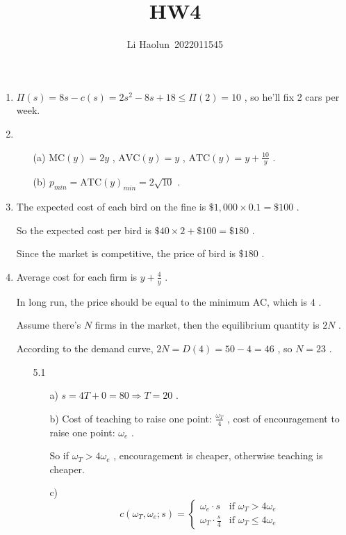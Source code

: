 \documentclass{article}
\title{HW4}
\author{Li Haolun\ 2022011545}
\begin{document}
\maketitle
\begin{enumerate}
    \item $\Pi(s)=8s-c(s)=2s^2-8s+18\leq\Pi(2)=10$ , so he'll fix 2 cars per week.
    \item \begin{enumerate}
        \item[(a)] $\text{MC}(y)=2y$ , $\text{AVC}(y)=y$ , $\text{ATC}(y)=y+\frac{10}{y}$ .
        \item[(b)] $p_{min}=\text{ATC}(y)_{min}=2\sqrt{10}$ .
    \end{enumerate}
    \item The expected cost of each bird on the fine is $\$1,000\times0.1=\$100$ . \par
    So the expected cost per bird is $\$40\times2+\$100=\$180$ . \par
    Since the market is competitive, the price of bird is $\$180$ .
    \item Average cost for each firm is $y+\frac{4}{y}$ . \par
    In long run, the price should be equal to the minimum AC, which is $4$ . \par
    Assume there's $N$ firms in the market, then the equilibrium quantity is $2N$ . \par
    According to the demand curve, $2N=D(4)=50-4=46$ , so $N=23$ .
    \item[] \begin{enumerate}
        \item[5.1] \begin{enumerate}
            \item[a)] $s=4T+0=80\Rightarrow T=20$ .
            \item[b)] Cost of teaching to raise one point: $\frac{\omega_T}{4}$ , cost of encouragement to raise one point: $\omega_e$ . \par
            So if $\omega_T>4\omega_e$ , encouragement is cheaper, otherwise teaching is cheaper.
            \item[c)] \begin{equation}
                c(\omega_T,\omega_e;s)=\begin{cases}
                    \omega_e\cdot s & \text{if } \omega_T>4\omega_e \\
                    \omega_T\cdot\frac{s}{4} & \text{if } \omega_T\leq4\omega_e

\end{cases}
\end{equation}
\end{enumerate}
\end{enumerate}
\end{enumerate}
\end{document}
